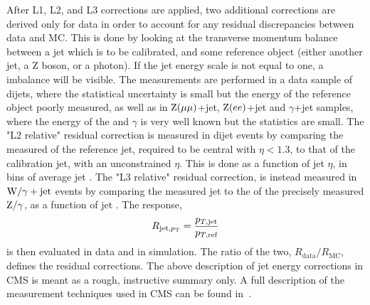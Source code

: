 After L1, L2, and L3 corrections are applied, two additional corrections are derived only for data in order to account for any residual discrepancies between data and MC. This is done by looking at the transverse momentum balance between a jet which is to be calibrated, and some reference object (either another jet, a Z boson, or a photon). If the jet energy scale is not equal to one, a \PT imbalance will be visible. The measurements are performed in a data sample of dijets, where the statistical uncertainty is small but the energy of the reference object poorly measured, as well as in $\mathrm{Z}(\mu\mu)$+jet, $\mathrm{Z}(ee)$+jet and $\gamma$+jet samples, where the energy of the \PZ and $\gamma$ is very well known but the statistics are small. \newline
The  "L2 relative" residual correction is measured in dijet events by comparing the measured \PT of the reference jet, required to be central with $\eta<1.3$, to that of the calibration jet, with an unconstrained $\eta$. This is done as a function of jet $\eta$, in bins of average jet \PT. The "L3 relative" residual correction, is instead measured in $\mathrm{W}/\gamma+\textrm{jet}$ events by comparing the measured jet \PT to the \PT of the precisely measured $\mathrm{Z}/\gamma$, as a function of jet \PT.
The response, 
\begin{equation*}
R_{\textrm{jet,\ensuremath{p_{\mathrm{T}}}}}=\frac{p_{T,\textrm{jet}}}{p_{T,\textrm{ref}}}
\end{equation*}
is then evaluated in data and in simulation. The ratio of the two, $R_{\textrm{data}}/R_{\textrm{MC}}$, defines the residual corrections.\newline\newline
The above description of jet energy corrections in CMS is meant as a rough, instructive summary only. A full description of the measurement techniques used in CMS can be found in~\cite{jme_jinst}. 

